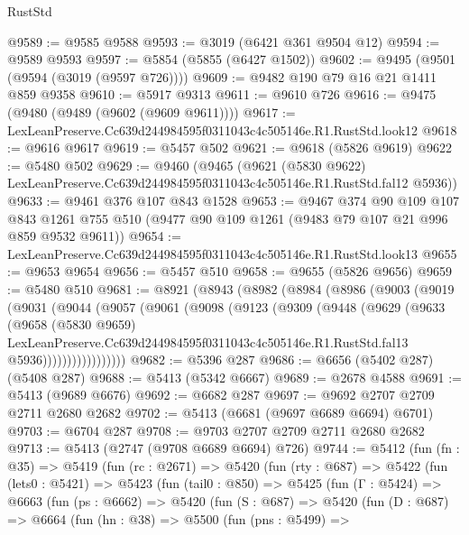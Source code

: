 \begin{lexlean}{RustStd}
\begin{coremodule}
@9589 := @9585 @9588
@9593 := @3019 (@6421 @361 @9504 @12)
@9594 := @9589 @9593
@9597 := @5854 (@5855 (@6427 @1502))
@9602 := @9495 (@9501 (@9594 (@3019 (@9597 @726))))
@9609 := @9482 @190 @79 @16 @21 @1411 @859 @9358
@9610 := @5917 @9313
@9611 := @9610 @726
@9616 := @9475 (@9480 (@9489 (@9602 (@9609 @9611))))
@9617 := LexLeanPreserve.Cc639d244984595f0311043c4c505146e.R1.RustStd.look12
@9618 := @9616 @9617
@9619 := @5457 @502
@9621 := @9618 (@5826 @9619)
@9622 := @5480 @502
@9629 := @9460
    (@9465
      (@9621
        (@5830 @9622)
        LexLeanPreserve.Cc639d244984595f0311043c4c505146e.R1.RustStd.fal12
        @5936))
@9633 := @9461 @376 @107 @843 @1528
@9653 := @9467
    @374
    @90
    @109
    @107
    @843
    @1261
    @755
    @510
    (@9477 @90 @109 @1261 (@9483 @79 @107 @21 @996 @859 @9532 @9611))
@9654 := LexLeanPreserve.Cc639d244984595f0311043c4c505146e.R1.RustStd.look13
@9655 := @9653 @9654
@9656 := @5457 @510
@9658 := @9655 (@5826 @9656)
@9659 := @5480 @510
@9681 := @8921
    (@8943
      (@8982
        (@8984
          (@8986
            (@9003
              (@9019
                (@9031
                  (@9044
                    (@9057
                      (@9061
                        (@9098
                          (@9123
                            (@9309
                              (@9448
                                (@9629
                                  (@9633
                                    (@9658
                                      (@5830 @9659)
                                      LexLeanPreserve.Cc639d244984595f0311043c4c505146e.R1.RustStd.fal13
                                      @5936)))))))))))))))))
@9682 := @5396 @287
@9686 := @6656 (@5402 @287) (@5408 @287)
@9688 := @5413 (@5342 @6667)
@9689 := @2678 @4588
@9691 := @5413 (@9689 @6676)
@9692 := @6682 @287
@9697 := @9692 @2707 @2709 @2711 @2680 @2682
@9702 := @5413 (@6681 (@9697 @6689 @6694) @6701)
@9703 := @6704 @287
@9708 := @9703 @2707 @2709 @2711 @2680 @2682
@9713 := @5413 (@2747 (@9708 @6689 @6694) @726)
@9744 := @5412
    (fun (fn : @35) =>
    @5419
      (fun (rc : @2671) =>
      @5420
        (fun (rty : @687) =>
        @5422
          (fun (lets0 : @5421) =>
          @5423
            (fun (tail0 : @850) =>
            @5425
              (fun (Γ : @5424) =>
              @6663
                (fun (ps : @6662) =>
                @5420
                  (fun (S : @687) =>
                  @5420
                    (fun (D : @687) =>
                    @6664
                      (fun (hn : @38) =>
                      @5500
                        (fun (pns : @5499) =>

\end{coremodule}
\end{lexlean}
